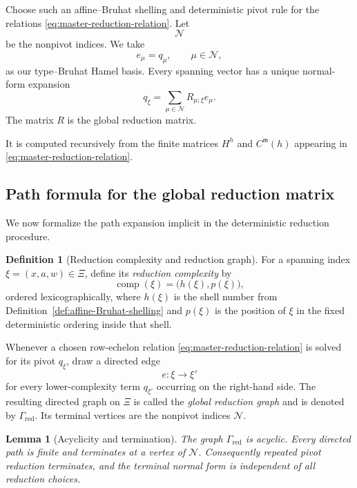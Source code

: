 \documentclass[12pt]{article}
\newtheorem{lemma}[theorem]{Lemma}
\theoremstyle{definition}
\newtheorem{definition}[theorem]{Definition}
\theoremstyle{remark}
\begin{document}
Choose such an affine--Bruhat shelling and deterministic pivot rule for the
relations \eqref{eq:master-reduction-relation}.  Let
\[
 \mathscr N
\]
be the nonpivot indices.  We take
\[
 e_\mu=q_\mu,\qquad\mu\in\mathscr N,
\]
as our type--Bruhat Hamel basis.  Every spanning vector has a unique
normal-form expansion
\begin{equation}\label{eq:global-reduction-matrix}
 q_\xi
 =
 \sum_{\mu\in\mathscr N}
 R_{\mu;\xi}e_\mu.
\end{equation}
The matrix \(R\) is the global reduction matrix.

It is computed recursively from the finite matrices
\(H^h\) and \(C^{\mathfrak m}(h)\) appearing in
\eqref{eq:master-reduction-relation}.

\subsection{Path formula for the global reduction matrix}

We now formalize the path expansion implicit in the deterministic reduction
procedure.

\begin{definition}[Reduction complexity and reduction graph]
\label{def:global-reduction-graph}
For a spanning index \(\xi=(x,a,w)\in\Xi\), define its
\emph{reduction complexity} by
\[
 \operatorname{comp}(\xi)
 =
 \bigl(h(\xi),p(\xi)\bigr),
\]
ordered lexicographically, where \(h(\xi)\) is the shell number from
Definition~\ref{def:affine-Bruhat-shelling} and \(p(\xi)\) is the position of
\(\xi\) in the fixed deterministic ordering inside that shell.

Whenever a chosen row-echelon relation
\eqref{eq:master-reduction-relation} is solved for its pivot \(q_\xi\), draw a
directed edge
\[
 e:\xi\longrightarrow\xi'
\]
for every lower-complexity term \(q_{\xi'}\) occurring on the right-hand
side.  The resulting directed graph on \(\Xi\) is called the
\emph{global reduction graph} and is denoted by \(\Gamma_{\mathrm{red}}\).
Its terminal vertices are the nonpivot indices \(\mathscr N\).
\end{definition}

\begin{lemma}[Acyclicity and termination]
\label{lem:global-reduction-graph-acyclic}
The graph \(\Gamma_{\mathrm{red}}\) is acyclic.  Every directed path is
finite and terminates at a vertex of \(\mathscr N\).  Consequently repeated
pivot reduction terminates, and the terminal normal form is independent of
all reduction choices.
\end{lemma}
\end{document}
